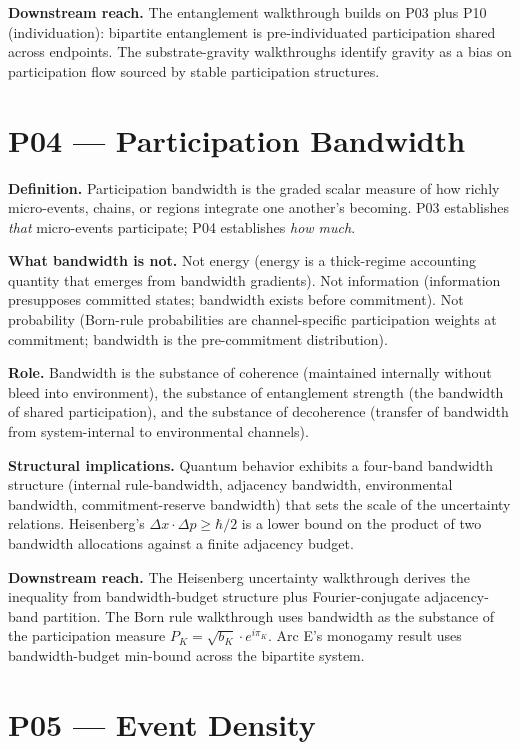 \documentclass[11pt,a4paper]{article}
\begin{document}
\textbf{Downstream reach.} The entanglement walkthrough builds on P03 plus P10 (individuation): bipartite entanglement is pre-individuated participation shared across endpoints. The substrate-gravity walkthroughs identify gravity as a bias on participation flow sourced by stable participation structures.

\section{P04 --- Participation Bandwidth}

\textbf{Definition.} Participation bandwidth is the graded scalar measure of how richly micro-events, chains, or regions integrate one another's becoming. P03 establishes \emph{that} micro-events participate; P04 establishes \emph{how much}.

\textbf{What bandwidth is not.} Not energy (energy is a thick-regime accounting quantity that emerges from bandwidth gradients). Not information (information presupposes committed states; bandwidth exists before commitment). Not probability (Born-rule probabilities are channel-specific participation weights at commitment; bandwidth is the pre-commitment distribution).

\textbf{Role.} Bandwidth is the substance of coherence (maintained internally without bleed into environment), the substance of entanglement strength (the bandwidth of shared participation), and the substance of decoherence (transfer of bandwidth from system-internal to environmental channels).

\textbf{Structural implications.} Quantum behavior exhibits a four-band bandwidth structure (internal rule-bandwidth, adjacency bandwidth, environmental bandwidth, commitment-reserve bandwidth) that sets the scale of the uncertainty relations. Heisenberg's $\Delta x \cdot \Delta p \geq \hbar/2$ is a lower bound on the product of two bandwidth allocations against a finite adjacency budget.

\textbf{Downstream reach.} The Heisenberg uncertainty walkthrough derives the inequality from bandwidth-budget structure plus Fourier-conjugate adjacency-band partition. The Born rule walkthrough uses bandwidth as the substance of the participation measure $P_K = \sqrt{b_K} \cdot e^{i\pi_K}$. Arc E's monogamy result uses bandwidth-budget min-bound across the bipartite system.

\section{P05 --- Event Density}
\end{document}
